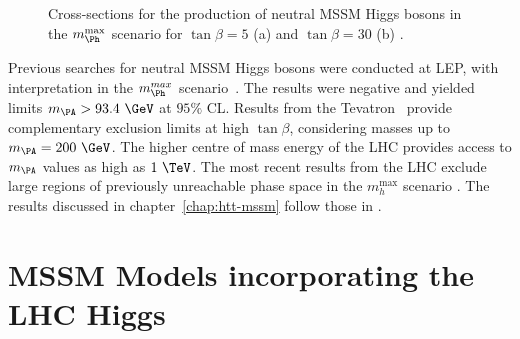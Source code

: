 \begin{figure}[htbp]
\caption[Cross-sections for the production of neutral MSSM Higgs bosons in the 
$m_{\Ph}^{\text{max}}$ scenario.]{Cross-sections for the production of neutral MSSM Higgs bosons in the 
$m_{\Ph}^{\text{max}}$ scenario for $\tan\beta=5$ (a) and $\tan\beta=30$
(b) \cite{Heinemeyer:2013tqa}.}
\label{fig:mhmaxXSs}
\end{figure}

Previous searches for neutral \ac{MSSM} Higgs bosons were conducted at LEP, with
interpretation in the $m_{\Ph}^{max}$ scenario~\cite{Schael:2006cr}.
The results were negative and yielded limits $m_{\PA} > 93.4~\GeV$ at $95\%$ CL.  
Results from the Tevatron~\cite{Benjamin:2010xb} provide complementary exclusion 
limits at high $\tan\beta$, considering masses up to $m_{\PA}=200~\GeV$. The
higher centre of mass energy of the LHC provides access to $m_{\PA}$ values as
high as $1~\TeV$. The most recent results from the LHC exclude large regions of
previously unreachable phase space in the $m_{h}^{\text{max}}$ scenario
\cite{Aad:2014vgg,HIG-13-021}. The results discussed in
chapter~\ref{chap:htt-mssm} follow those in \cite{HIG-13-021}.

\section{MSSM Models incorporating the LHC Higgs}
\label{sec:mssmbenchmarks}

